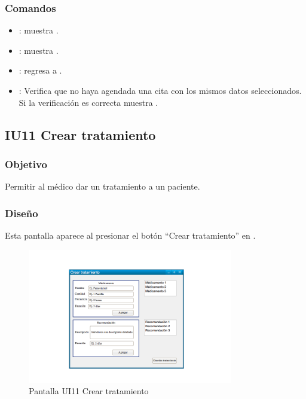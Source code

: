 \subsubsection{Comandos}
	\begin{itemize}
	    \item {}: muestra . 
	    \item {}: muestra . 
	    \item {}: regresa a . 
	    \item {}: Verifica que no haya agendada una cita con los mismos datos seleccionados. Si la verificación es correcta muestra .  
	\end{itemize}

\subsection{IU11 Crear tratamiento}

\subsubsection{Objetivo}
Permitir al médico dar un tratamiento a un paciente.

\subsubsection{Diseño}
Esta pantalla aparece al presionar el botón ``Crear tratamiento'' en .   

\begin{figure}[htbp!]
    \centering
        \includegraphics[width=0.8\textwidth]{images/UI11}
    \caption{Pantalla UI11 Crear tratamiento}
\end{figure}


